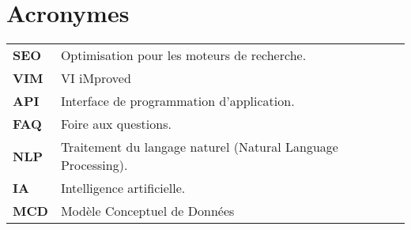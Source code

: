 \chapter{Acronymes}


\begin{tabular}{l l}


\textbf{SEO} & Optimisation pour les moteurs de recherche.\\
\textbf{VIM} & VI iMproved\\
\textbf{API} & Interface de programmation d'application.\\
\textbf{FAQ} & Foire aux questions.\\
\textbf{NLP} & Traitement du langage naturel (Natural Language Processing).\\
\textbf{IA} & Intelligence artificielle.\\
\textbf{MCD} & Modèle Conceptuel de Données\\


\end{tabular}

\pagebreak

